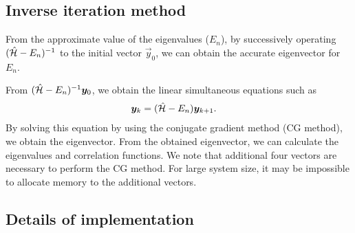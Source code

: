 \subsection{Inverse iteration method}

From the approximate value of the eigenvalues ($E_{n}$),
by successively operating $(\hat{\mathcal{H}}-E_{n})^{-1}$
to the initial vector $\vec{y}_{0}$,
we can obtain the accurate eigenvector for $E_{n}$.

From $(\hat{\mathcal{H}}-E_{n})^{-1}\boldsymbol y_{0}$,
we obtain the linear simultaneous equations such as  
\begin{align}
\boldsymbol y_{k}&=(\hat{\mathcal{H}}-E_{n})\boldsymbol y_{k+1}. \label{eq: TPQVector}
\end{align}
By solving this equation by using the
conjugate gradient method (CG method),
we obtain the eigenvector.
From the obtained eigenvector,
we can calculate the eigenvalues and correlation functions. 
We note that additional four vectors are necessary to
perform the CG method.
For large system size,
it may be impossible to allocate memory to the
additional vectors.

\subsection{Details of implementation}
